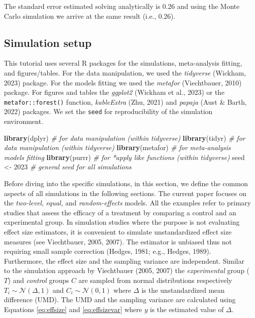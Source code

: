 \documentclass[
  man,floatsintext]{apa6}
\newenvironment{Shaded}{\begin{snugshade}}{\end{snugshade}}
\newcommand{\CommentTok}[1]{\textcolor[rgb]{0.56,0.35,0.01}{\textit{#1}}}
\newcommand{\DecValTok}[1]{\textcolor[rgb]{0.00,0.00,0.81}{#1}}
\newcommand{\FunctionTok}[1]{\textcolor[rgb]{0.13,0.29,0.53}{\textbf{#1}}}
\newcommand{\NormalTok}[1]{#1}
\newcommand{\OtherTok}[1]{\textcolor[rgb]{0.56,0.35,0.01}{#1}}
\begin{document}
\normalsize

The standard error estimated solving analytically is 0.26 and using the Monte Carlo simulation we arrive at the same result (i.e., 0.26).

\hypertarget{simulation-setup}{%
\subsection{Simulation setup}\label{simulation-setup}}

This tutorial uses several R packages for the simulations, meta-analysis fitting, and figures/tables. For the data manipulation, we used the \emph{tidyverse} (Wickham, 2023) package. For the models fitting we used the \emph{metafor} (Viechtbauer, 2010) package. For figures and tables the \emph{ggplot2} (Wickham et al., 2023) or the \texttt{metafor::forest()} function, \emph{kableExtra} (Zhu, 2021) and \emph{papaja} (Aust \& Barth, 2022) packages. We set the \texttt{seed} for reproducibility of the simulation environment.

\scriptsize

\begin{Shaded}
\begin{Highlighting}[]
\FunctionTok{library}\NormalTok{(dplyr) }\CommentTok{\# for data manipulation (within tidyverse)}
\FunctionTok{library}\NormalTok{(tidyr) }\CommentTok{\# for data manipulation (within tidyverse)}
\FunctionTok{library}\NormalTok{(metafor) }\CommentTok{\# for meta{-}analysis models fitting}
\FunctionTok{library}\NormalTok{(purrr) }\CommentTok{\# for *apply like functions (within tidyverse)}
\NormalTok{seed }\OtherTok{\textless{}{-}} \DecValTok{2023} \CommentTok{\# general seed for all simulations}
\end{Highlighting}
\end{Shaded}

\normalsize

Before diving into the specific simulations, in this section, we define the common aspects of all simulations in the following sections. The current paper focuses on the \emph{two-level}, \emph{equal,} and \emph{random-effects} models. All the examples refer to primary studies that assess the efficacy of a treatment by comparing a control and an experimental group. In simulation studies where the purpose is not evaluating effect size estimators, it is convenient to simulate unstandardized effect size measures (see Viechtbauer, 2005, 2007). The estimator is unbiased thus not requiring small sample correction (Hedges, 1981; e.g., Hedges, 1989). Furthermore, the effect size and the sampling variance are independent. Similar to the simulation approach by Viechtbauer (2005, 2007) the \emph{experimental} group (\(T\)) and \emph{control} groups \(C\) are sampled from normal distributions respectively \(T_i \sim \mathcal{N}(\Delta, 1)\) and \(C_i \sim \mathcal{N}(0, 1)\) where \(\Delta\) is the unstandardized mean difference (UMD). The UMD and the sampling variance are calculated using Equations \eqref{eq:effsize} and \eqref{eq:effsizevar} where \(y\) is the estimated value of \(\Delta\).
\end{document}
